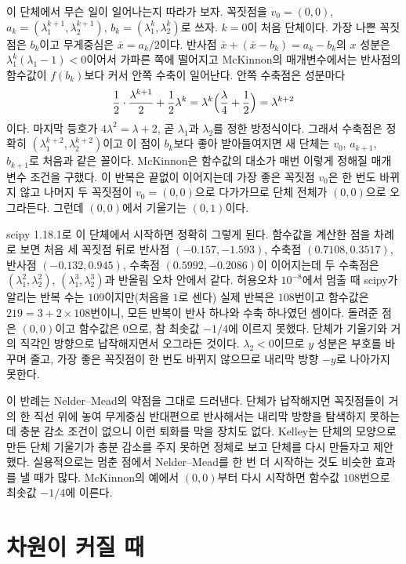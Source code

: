 이 단체에서 무슨 일이 일어나는지 따라가 보자. 꼭짓점을 $v_0=(0,0)$, $a_k=(\lambda_1^{k+1},\lambda_2^{k+1})$, $b_k=(\lambda_1^k,\lambda_2^k)$로 쓰자. $k=0$이 처음 단체이다. 가장 나쁜 꼭짓점은 $b_k$이고 무게중심은 $\bar x=a_k/2$이다. 반사점 $\bar x+(\bar x-b_k)=a_k-b_k$의 $x$ 성분은 $\lambda_1^k(\lambda_1-1)<0$이어서 가파른 쪽에 떨어지고 McKinnon의 매개변수에서는 반사점의 함수값이 $f(b_k)$보다 커서 안쪽 수축이 일어난다. 안쪽 수축점은 성분마다
\[
\frac12\cdot\frac{\lambda^{k+1}}2+\frac12\lambda^k=\lambda^k\Bigl(\frac\lambda4+\frac12\Bigr)=\lambda^{k+2}
\]
이다. 마지막 등호가 $4\lambda^2=\lambda+2$, 곧 $\lambda_1$과 $\lambda_2$를 정한 방정식이다. 그래서 수축점은 정확히 $(\lambda_1^{k+2},\lambda_2^{k+2})$이고 이 점이 $b_k$보다 좋아 받아들여지면 새 단체는 $v_0$, $a_{k+1}$, $b_{k+1}$로 처음과 같은 꼴이다. McKinnon은 함수값의 대소가 매번 이렇게 정해질 매개변수 조건을 구했다. 이 반복은 끝없이 이어지는데 가장 좋은 꼭짓점 $v_0$은 한 번도 바뀌지 않고 나머지 두 꼭짓점이 $v_0=(0,0)$으로 다가가므로 단체 전체가 $(0,0)$으로 오그라든다. 그런데 $(0,0)$에서 기울기는 $(0,1)$이다.

scipy 1.18.1로 이 단체에서 시작하면 정확히 그렇게 된다. 함수값을 계산한 점을 차례로 보면 처음 세 꼭짓점 뒤로 반사점 $(-0.157,-1.593)$, 수축점 $(0.7108,0.3517)$, 반사점 $(-0.132,0.945)$, 수축점 $(0.5992,-0.2086)$이 이어지는데 두 수축점은 $(\lambda_1^2,\lambda_2^2)$, $(\lambda_1^3,\lambda_2^3)$과 반올림 오차 안에서 같다. 허용오차 $10^{-8}$에서 멈출 때 scipy가 알리는 반복 수는 $109$이지만(처음을 $1$로 센다) 실제 반복은 $108$번이고 함수값은 $219=3+2\times108$번이니, 모든 반복이 반사 하나와 수축 하나였던 셈이다. 돌려준 점은 $(0,0)$이고 함수값은 $0$으로, 참 최솟값 $-1/4$에 이르지 못했다. 단체가 기울기와 거의 직각인 방향으로 납작해지면서 오그라든 것이다. $\lambda_2<0$이므로 $y$ 성분은 부호를 바꾸며 줄고, 가장 좋은 꼭짓점이 한 번도 바뀌지 않으므로 내리막 방향 $-y$로 나아가지 못한다.

이 반례는 Nelder--Mead의 약점을 그대로 드러낸다. 단체가 납작해지면 꼭짓점들이 거의 한 직선 위에 놓여 무게중심 반대편으로 반사해서는 내리막 방향을 탐색하지 못하는데 충분 감소 조건이 없으니 이런 퇴화를 막을 장치도 없다. Kelley는 단체의 모양으로 만든 단체 기울기가 충분 감소를 주지 못하면 정체로 보고 단체를 다시 만들자고 제안했다\cite{kelley1999}. 실용적으로는 멈춘 점에서 Nelder--Mead를 한 번 더 시작하는 것도 비슷한 효과를 낼 때가 많다. McKinnon의 예에서 $(0,0)$부터 다시 시작하면 함수값 $108$번으로 최솟값 $-1/4$에 이른다.

\section{차원이 커질 때}
\label{sec:nm-dimension}

